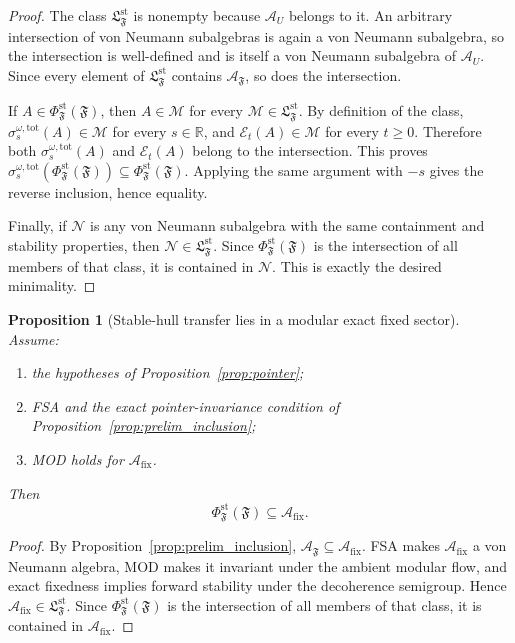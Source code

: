 \documentclass[12pt]{article}
\newtheorem{proposition}[theorem]{Proposition}
\theoremstyle{definition}
\theoremstyle{remark}
\begin{document}
\begin{proof}
The class \(\mathfrak L_{\mathfrak F}^{\mathrm{st}}\) is nonempty
because \(\mathcal A_U\) belongs to it. An arbitrary intersection of
von Neumann subalgebras is again a von Neumann subalgebra, so the
intersection is well-defined and is itself a von Neumann subalgebra of
\(\mathcal A_U\). Since every element of
\(\mathfrak L_{\mathfrak F}^{\mathrm{st}}\) contains
\(\mathcal A_{\mathfrak F}\), so does the intersection.

If \(A\in\Phi_{\mathfrak F}^{\mathrm{st}}(\mathfrak F)\), then
\(A\in\mathcal M\) for every
\(\mathcal M\in\mathfrak L_{\mathfrak F}^{\mathrm{st}}\). By definition
of the class,
\(\sigma_s^{\omega,\mathrm{tot}}(A)\in\mathcal M\) for every
\(s\in\mathbb R\), and
\(\mathcal E_t(A)\in\mathcal M\) for every \(t\ge 0\). Therefore both
\(\sigma_s^{\omega,\mathrm{tot}}(A)\) and \(\mathcal E_t(A)\) belong to
the intersection. This proves
\(\sigma_s^{\omega,\mathrm{tot}}(\Phi_{\mathfrak F}^{\mathrm{st}}(\mathfrak F))
\subseteq \Phi_{\mathfrak F}^{\mathrm{st}}(\mathfrak F)\). Applying the
same argument with \(-s\) gives the reverse inclusion, hence equality.

Finally, if \(\mathcal N\) is any von Neumann subalgebra with the same
containment and stability properties, then
\(\mathcal N\in\mathfrak L_{\mathfrak F}^{\mathrm{st}}\). Since
\(\Phi_{\mathfrak F}^{\mathrm{st}}(\mathfrak F)\) is the intersection of
all members of that class, it is contained in \(\mathcal N\). This is
exactly the desired minimality.
\end{proof}

\begin{proposition}[Stable-hull transfer lies in a modular exact fixed sector]\label{prop:stablehull_inclusion}
Assume:
\begin{enumerate}
\item the hypotheses of Proposition~\ref{prop:pointer};
\item FSA and the exact pointer-invariance condition of
  Proposition~\ref{prop:prelim_inclusion};
\item MOD holds for \(\mathcal A_{\mathrm{fix}}\).
\end{enumerate}
Then
\[
\Phi_{\mathfrak F}^{\mathrm{st}}(\mathfrak F)\subseteq
\mathcal A_{\mathrm{fix}}.
\]
\end{proposition}

\begin{proof}
By Proposition~\ref{prop:prelim_inclusion},
\(\mathcal A_{\mathfrak F}\subseteq \mathcal A_{\mathrm{fix}}\).
FSA makes \(\mathcal A_{\mathrm{fix}}\) a von Neumann algebra, MOD makes
it invariant under the ambient modular flow, and exact fixedness implies
forward stability under the decoherence semigroup. Hence
\(\mathcal A_{\mathrm{fix}}\in \mathfrak L_{\mathfrak F}^{\mathrm{st}}\).
Since \(\Phi_{\mathfrak F}^{\mathrm{st}}(\mathfrak F)\) is the
intersection of all members of that class, it is contained in
\(\mathcal A_{\mathrm{fix}}\).
\end{proof}
\end{document}
